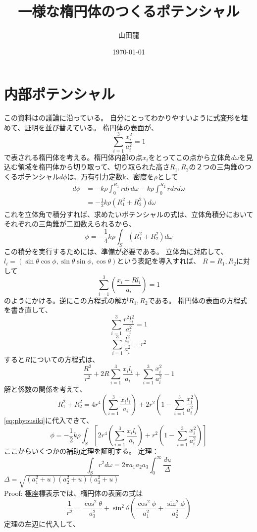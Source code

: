 \documentclass{jsarticle}
\date{\today}
\author{山田龍}
\title{一様な楕円体のつくるポテンシャル}
\newcommand{\half}{\frac{1}{2}}
\newcommand{\beq}{\begin{equation}}
\newcommand{\eeq}{\end{equation}}
\newcommand{\xid}{x_i^2}
\newcommand{\lid}{l_i^2}
\newcommand{\aid}{a_i^2}
\newcommand{\sumit}{\sum_{i=1}^3}
\newcommand{\cosdt}{\cos^2\theta}
\newcommand{\sindt}{\sin^2\theta}
\newcommand{\cosdp}{\cos^2\phi}
\newcommand{\sindp}{\sin^2\phi}
\begin{document}
\maketitle
\section{内部ポテンシャル}
この資料は\cite{Chandrasekhar1969-ny}の議論に沿っている。
自分にとってわかりやすいように式変形を埋めて、証明を並び替えている。
楕円体の表面が、
\beq
\sum_{i=1}^3 \frac{\xid}{\aid} = 1
\eeq
で表される楕円体を考える。楕円体内部の点$x_i$をとってこの点から立体角$d\omega$を見込む領域を楕円体から切り取って、切り取られた高さ$R_1, R_2$の２つの三角錐のつくるポテンシャル$d\phi$は、万有引力定数k、密度を$\rho$として
\begin{align}
d\phi &= -k \rho \int_{0}^{R_1} r dr d\omega -
k \rho \int_{0}^{R_2} r dr d\omega\\
      &=  -\half k \rho (R_1^2 + R_2^2) d\omega
\end{align}
これを立体角で積分すれば、求めたいポテンシャルの式は、立体角積分においてそれぞれの三角錐が二回数えられるから、
\beq
\phi = -\frac{1}{4} k \rho \int_S (R_1^2 + R_2^2) d\omega\label{eq:phyousiki}
\eeq
この積分を実行するためには、準備が必要である。
立体角に対応して、$l_i = (\sin\theta \cos\phi, \sin\theta \sin\phi ,\cos\theta)$という表記を導入すれば、
$R = R_1, R_2$に対して
\beq
\sum_{i=1}^3 \left (\frac{x_i + R l_i}{a_i} \right) = 1\label{eq:daenl}
\eeq
のようにかける。逆にこの方程式の解が$R_1,R_2$である。
楕円体の表面の方程式を書き直して、
\beq
\sum_{i=1}^3 \frac{r^2 \lid}{\aid} = 1
\eeq
\beq
\sum_{i=1}^3 \frac{\lid}{\aid} = r^2
\eeq
すると$R$についての方程式は、
\beq
\frac{R^2}{r^2} + 2R\sumit \frac{x_i l_i}{a_i} + \sumit \frac{\xid}{\aid} - 1
\eeq
解と係数の関係を考えて、
\beq
R_1^2 + R_2^2 = 4r^4 \left(\sumit \frac{x_i l_i}{a_i} \right) + 2r^2 \left(1 -  \sumit \frac{\xid}{\aid}
\right)
\eeq
\eqref{eq:phyousiki}に代入できて、
\beq
\phi = -\frac{1}{2} k \rho \int_S \left[2r^4 \left(\sumit \frac{x_i l_i}{a_i} \right) + r^2 \left(1 -  \sumit \frac{\xid}{\aid}\right)\right]
\label{eq:steptwo}
\eeq
ここからいくつかの補助定理を証明する。
定理：
\beq
\int _S r^2 d\omega = 2 \pi a_1 a_2 a_3 \int_0^{\infty} \frac{du}{\Delta}
\eeq
$\Delta = \sqrt{(a_1^2 + u)(a_2^2 + u)(a_3^2 + u)}$\\
Proof:
極座標表示では、楕円体の表面の式は
\beq
\frac{1}{r^2} = \frac{\cosdt}{a_3^2} + \sindt(\frac{\cosdp}{a_1^2} + \frac{\sindp}{a_2^2})
\eeq
定理の左辺に代入して、
\end{document}
